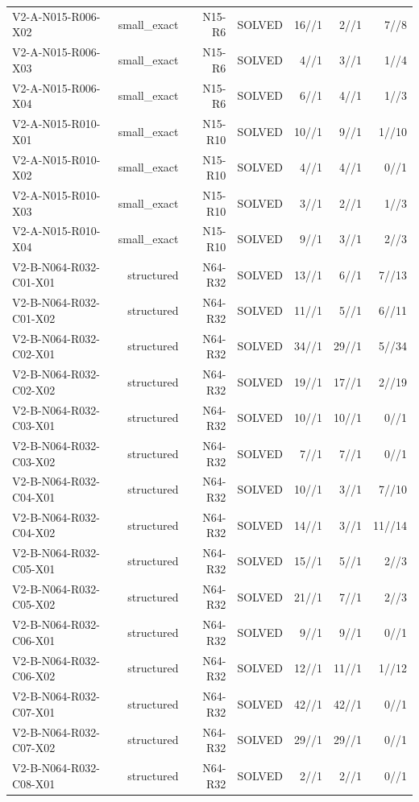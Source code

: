 {\begin{longtable}{lrrrrrr}
V2-A-N015-R006-X02 & small\_exact & N15-R6 & SOLVED & 16//1 & 2//1 & 7//8 \\
V2-A-N015-R006-X03 & small\_exact & N15-R6 & SOLVED & 4//1 & 3//1 & 1//4 \\
V2-A-N015-R006-X04 & small\_exact & N15-R6 & SOLVED & 6//1 & 4//1 & 1//3 \\
V2-A-N015-R010-X01 & small\_exact & N15-R10 & SOLVED & 10//1 & 9//1 & 1//10 \\
V2-A-N015-R010-X02 & small\_exact & N15-R10 & SOLVED & 4//1 & 4//1 & 0//1 \\
V2-A-N015-R010-X03 & small\_exact & N15-R10 & SOLVED & 3//1 & 2//1 & 1//3 \\
V2-A-N015-R010-X04 & small\_exact & N15-R10 & SOLVED & 9//1 & 3//1 & 2//3 \\
V2-B-N064-R032-C01-X01 & structured & N64-R32 & SOLVED & 13//1 & 6//1 & 7//13 \\
V2-B-N064-R032-C01-X02 & structured & N64-R32 & SOLVED & 11//1 & 5//1 & 6//11 \\
V2-B-N064-R032-C02-X01 & structured & N64-R32 & SOLVED & 34//1 & 29//1 & 5//34 \\
V2-B-N064-R032-C02-X02 & structured & N64-R32 & SOLVED & 19//1 & 17//1 & 2//19 \\
V2-B-N064-R032-C03-X01 & structured & N64-R32 & SOLVED & 10//1 & 10//1 & 0//1 \\
V2-B-N064-R032-C03-X02 & structured & N64-R32 & SOLVED & 7//1 & 7//1 & 0//1 \\
V2-B-N064-R032-C04-X01 & structured & N64-R32 & SOLVED & 10//1 & 3//1 & 7//10 \\
V2-B-N064-R032-C04-X02 & structured & N64-R32 & SOLVED & 14//1 & 3//1 & 11//14 \\
V2-B-N064-R032-C05-X01 & structured & N64-R32 & SOLVED & 15//1 & 5//1 & 2//3 \\
V2-B-N064-R032-C05-X02 & structured & N64-R32 & SOLVED & 21//1 & 7//1 & 2//3 \\
V2-B-N064-R032-C06-X01 & structured & N64-R32 & SOLVED & 9//1 & 9//1 & 0//1 \\
V2-B-N064-R032-C06-X02 & structured & N64-R32 & SOLVED & 12//1 & 11//1 & 1//12 \\
V2-B-N064-R032-C07-X01 & structured & N64-R32 & SOLVED & 42//1 & 42//1 & 0//1 \\
V2-B-N064-R032-C07-X02 & structured & N64-R32 & SOLVED & 29//1 & 29//1 & 0//1 \\
V2-B-N064-R032-C08-X01 & structured & N64-R32 & SOLVED & 2//1 & 2//1 & 0//1 \\

\end{longtable}}
